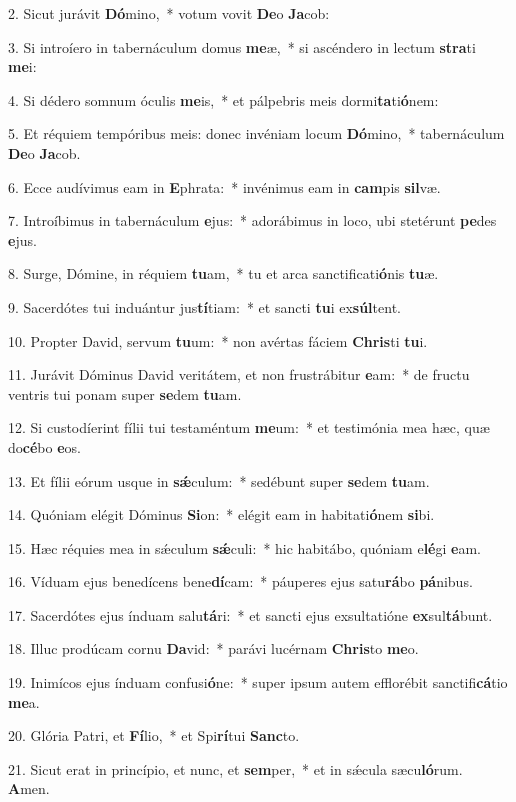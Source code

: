 2. Sicut jurávit \textbf{Dó}mino,~*  votum vovit \textbf{De}o \textbf{Ja}cob:\

3. Si introíero in tabernáculum domus \textbf{me}æ,~*  si ascéndero in lectum \textbf{stra}ti \textbf{me}i:\

4. Si dédero somnum óculis \textbf{me}is,~*  et pálpebris meis dormi\textbf{ta}ti\textbf{ó}nem:\

5. Et réquiem tempóribus meis: donec invéniam locum \textbf{Dó}mino,~*  tabernáculum \textbf{De}o \textbf{Ja}cob.\

6. Ecce audívimus eam in \textbf{E}phrata:~*  invénimus eam in \textbf{cam}pis \textbf{sil}væ.\

7. Introíbimus in tabernáculum \textbf{e}jus:~*  adorábimus in loco, ubi stetérunt \textbf{pe}des \textbf{e}jus.\

8. Surge, Dómine, in réquiem \textbf{tu}am,~*  tu et arca sanctificati\textbf{ó}nis \textbf{tu}æ.\

9. Sacerdótes tui induántur jus\textbf{tí}tiam:~*  et sancti \textbf{tu}i ex\textbf{súl}tent.\

10. Propter David, servum \textbf{tu}um:~*  non avértas fáciem \textbf{Chris}ti \textbf{tu}i.\

11. Jurávit Dóminus David veritátem, et non frustrábitur \textbf{e}am:~*  de fructu ventris tui ponam super \textbf{se}dem \textbf{tu}am.\

12. Si custodíerint fílii tui testaméntum \textbf{me}um:~*  et testimónia mea hæc, quæ do\textbf{cé}bo \textbf{e}os.\

13. Et fílii eórum usque in \textbf{sǽ}culum:~*  sedébunt super \textbf{se}dem \textbf{tu}am.\

14. Quóniam elégit Dóminus \textbf{Si}on:~*  elégit eam in habitati\textbf{ó}nem \textbf{si}bi.\

15. Hæc réquies mea in sǽculum \textbf{sǽ}culi:~*  hic habitábo, quóniam e\textbf{lé}gi \textbf{e}am.\

16. Víduam ejus benedícens bene\textbf{dí}cam:~*  páuperes ejus satu\textbf{rá}bo \textbf{pá}nibus.\

17. Sacerdótes ejus índuam salu\textbf{tá}ri:~*  et sancti ejus exsultatióne \textbf{ex}sul\textbf{tá}bunt.\

18. Illuc prodúcam cornu \textbf{Da}vid:~*  parávi lucérnam \textbf{Chris}to \textbf{me}o.\

19. Inimícos ejus índuam confusi\textbf{ó}ne:~*  super ipsum autem efflorébit sanctifi\textbf{cá}tio \textbf{me}a.\

20. Glória Patri, et \textbf{Fí}lio,~*  et Spi\textbf{rí}tui \textbf{Sanc}to.\

21. Sicut erat in princípio, et nunc, et \textbf{sem}per,~*  et in sǽcula sæcu\textbf{ló}rum. \textbf{A}men.\

